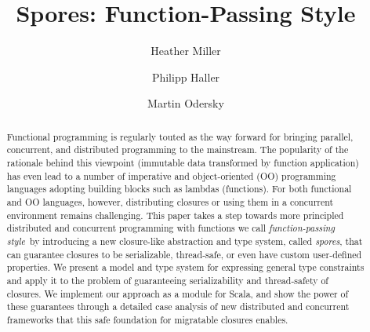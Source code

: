 \documentclass{llncs}
\begin{document}
%
\mainmatter              %
%
\title{Spores: Function-Passing Style}
%
%
\author{Heather Miller \and Philipp Haller
\and Martin Odersky}
%
%
%

\maketitle              %

\begin{abstract}

Functional programming is regularly touted as the way forward for bringing
parallel, concurrent, and distributed programming to the mainstream. The
popularity of the rationale behind this viewpoint (immutable data transformed
by function application) has even lead to a number of imperative and object-oriented (OO)
programming languages adopting building blocks such as lambdas
(functions). For both functional 
and OO languages, however, distributing closures or using them in a concurrent 
environment remains challenging. This paper takes a
step towards more principled distributed and concurrent programming with functions we call
{\em function-passing style}~by introducing a new closure-like abstraction and type system,
called {\em spores}, that can guarantee closures to be serializable, thread-safe, 
or even have custom user-defined properties. We present a model and type
system for expressing general type constraints and apply it to the problem of
guaranteeing serializability and thread-safety of closures. We implement our
approach as a module for Scala, and show the power of these guarantees through
a detailed case analysis of new distributed and concurrent frameworks that
this safe foundation for migratable closures enables.

\end{abstract}
%
\end{document}

